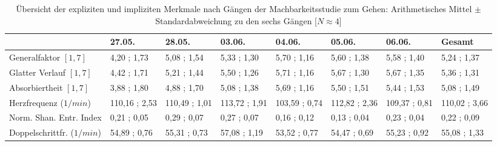 \begin{sidewaystable}
	\centering \caption[Übersicht der expliziten und impliziten Merkmale nach Gängen (Machbarkeitsstudie: Gehen)]{Übersicht der expliziten und impliziten Merkmale nach Gängen der Machbarkeitsstudie zum Gehen: Arithmetisches Mittel $\pm$ Standardabweichung zu den sechs Gängen [$N \approx 4$]} \label{tab:ubersicht_nach_gangen_2} 
	\begin{tabular}
		{lyyyyyyy} \toprule & 27.05. & 28.05. & 03.06. & 04.06. & 05.06. & 06.06. & Gesamt \\
		\midrule Generalfaktor $[1{,} 7]$ & 4{,}20 ; 1{,}73 & 5{,}08 ; 1{,}54 & 5{,}33 ; 1{,}30 & 5{,}70 ; 1{,}16 & 5{,}60 ; 1{,}38 & 5{,}58 ; 1{,}40 & 5{,}24 ; 1{,}37 \\
		Glatter Verlauf $[1{,} 7]$ & 4{,}42 ; 1{,}71 & 5{,}21 ; 1{,}44 & 5{,}50 ; 1{,}26 & 5{,}71 ; 1{,}16 & 5{,}67 ; 1{,}30 & 5{,}67 ; 1{,}35 & 5{,}36 ; 1{,}31 \\
		Absorbiertheit $[1{,} 7]$ & 3{,}88 ; 1{,}80 & 4{,}88 ; 1{,}70 & 5{,}08 ; 1{,}38 & 5{,}69 ; 1{,}16 & 5{,}50 ; 1{,}51 & 5{,}44 ; 1{,}53 & 5{,}08 ; 1{,}49 \\
		Herzfrequenz ($1/min$) & 110{,}16 ; 2{,}53 & 110{,}49 ; 1{,}01 & 113{,}72 ; 1{,}91 & 103{,}59 ; 0{,}74 & 112{,}82 ; 2{,}36 & 109{,}37 ; 0{,}81 & 110{,}02 ; 3{,}66 \\
		Norm. Shan. Entr. Index & 0{,}21 ; 0{,}05 & 0{,}29 ; 0{,}07 & 0{,}27 ; 0{,}07 & 0{,}16 ; 0{,}12 & 0{,}13 ; 0{,}04 & 0{,}23 ; 0{,}04 & 0{,}22 ; 0{,}09 \\
		Doppelschrittfr. ($1/min$) & 54{,}89 ; 0{,}76 & 55{,}31 ; 0{,}73 & 57{,}08 ; 1{,}19 & 53{,}52 ; 0{,}77 & 54{,}47 ; 0{,}69 & 55{,}23 ; 0{,}92 & 55{,}08 ; 1{,}33 \\
		\bottomrule 
	\end{tabular}
\end{sidewaystable}
